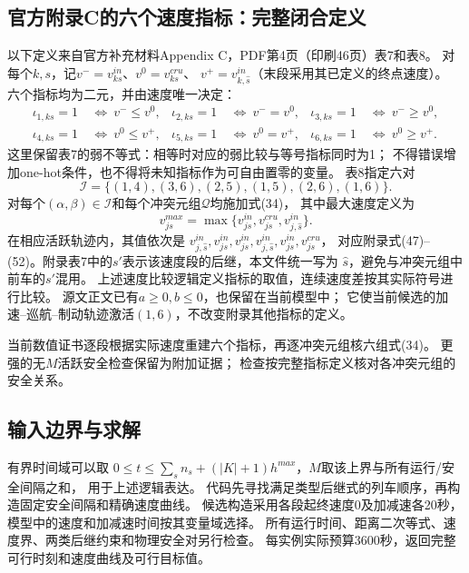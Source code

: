 \documentclass{ctexart}
\begin{document}
\subsection*{官方附录C的六个速度指标：完整闭合定义}
以下定义来自官方补充材料Appendix C，PDF第4页（印刷46页）表7和表8。
对每个$k,s$，记$v^-=v^{in}_{ks}$、$v^0=v^{cru}_{ks}$、
$v^+=v^{in}_{k,\widehat s}$（末段采用其已定义的终点速度）。
六个指标均为二元，并由速度唯一决定：
\begin{align*}
\iota_{1,ks}=1&\ \Longleftrightarrow\ v^-\le v^0,&
\iota_{2,ks}=1&\ \Longleftrightarrow\ v^-=v^0,&
\iota_{3,ks}=1&\ \Longleftrightarrow\ v^-\ge v^0,\\
\iota_{4,ks}=1&\ \Longleftrightarrow\ v^0\le v^+,&
\iota_{5,ks}=1&\ \Longleftrightarrow\ v^0=v^+,&
\iota_{6,ks}=1&\ \Longleftrightarrow\ v^0\ge v^+ .
\end{align*}
这里保留表7的弱不等式：相等时对应的弱比较与等号指标同时为1；
不得错误增加one-hot条件，也不得将未知指标作为可自由置零的变量。
表8指定六对
\[
\mathcal I=\{(1,4),(3,6),(2,5),(1,5),(2,6),(1,6)\}.
\]
对每个$(\alpha,\beta)\in\mathcal I$和每个冲突元组$\mathcal Q$均施加式(34)，
其中最大速度定义为
\[
v^{max}_{js}=\max\{v^{in}_{js},v^{cru}_{js},v^{in}_{j,\widehat s}\}.
\]
在相应活跃轨迹内，其值依次是
$v^{in}_{j,\widehat s},v^{in}_{js},v^{in}_{js},
v^{in}_{j,\widehat s},v^{in}_{js},v^{cru}_{js}$，
对应附录式(47)--(52)。附录表7中的$s'$表示该速度段的后继，本文件统一写为
$\widehat s$，避免与冲突元组中前车的$s'$混用。
上述速度比较逻辑定义指标的取值，连续速度差按其实际符号进行比较。
源文正文已有$a\ge0,b\le0$，也保留在当前模型中；
它使当前候选的加速--巡航--制动轨迹激活$(1,6)$，不改变附录其他指标的定义。

当前数值证书逐段根据实际速度重建六个指标，再逐冲突元组核六组式(34)。
更强的无$M$活跃安全检查保留为附加证据；
检查按完整指标定义核对各冲突元组的安全关系。

\subsection*{输入边界与求解}
有界时间域可以取
$0\le t\le\sum_sn_s+(|K|+1)h^{max}$，$M$取该上界与所有运行/安全间隔之和，
用于上述逻辑表达。
代码先寻找满足类型后继式的列车顺序，再构造固定安全间隔和精确速度曲线。
候选构造采用各段起终速度0及加减速各20秒，模型中的速度和加减速时间按其变量域选择。
所有运行时间、距离二次等式、速度界、两类后继约束和物理安全对另行检查。
每实例实际预算3600秒，返回完整可行时刻和速度曲线及可行目标值。
\end{document}

